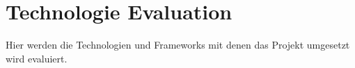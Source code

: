 \section{Technologie Evaluation}

Hier werden die Technologien und Frameworks mit denen das Projekt umgesetzt wird evaluiert.






